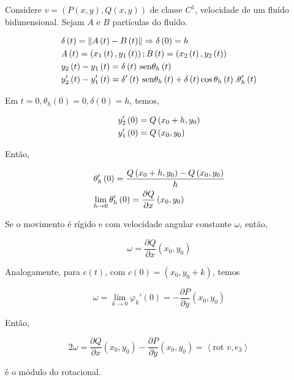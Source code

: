 \documentclass{book}
\begin{document}
\begin{ex}
Considere $v = \left( {P\left( {x,y} \right),Q\left( {x,y} \right)} \right)$ de classe $C^1$, velocidade de um flu\'ido bidimensional. Sejam $A$ e $B$ part\'iculas do flu\'ido.
\end{ex}

\begin{sol}

\[
\begin{gathered}
  \delta \left( t \right) = \left\| {A\left( t \right) - B\left( t \right)} \right\| \Rightarrow \delta \left( 0 \right) = h \hfill \\
  A\left( t \right) = \left( {x_1 \left( t \right),y_1 \left( t \right)} \right);B\left( t \right) = \left( {x_2 \left( t \right),y_2 \left( t \right)} \right) \hfill \\
  y_2 \left( t \right) - y_1 \left( t \right) = \delta \left( t \right)\sin \theta _h \left( t \right) \hfill \\
  y_2 '\left( t \right) - y_1 '\left( t \right) = \delta '\left( t \right)\sin \theta _h \left( t \right) + \delta \left( t \right)\cos \theta _h \left( t \right).\theta _h '\left( t \right) \hfill \\
\end{gathered}
\]

Em $t = 0,\theta _h \left( 0 \right) = 0,\delta \left( 0 \right) = h$, temos,

\[
\begin{gathered}
  y_2 '\left( 0 \right) = Q\left( {x_0  + h,y_0 } \right) \hfill \\
  y_1 '\left( 0 \right) = Q\left( {x_0 ,y_0 } \right) \hfill \\
\end{gathered}
\]

Ent\~ao,

\[
\begin{gathered}
  \theta _h '\left( 0 \right) = \frac{{Q\left( {x_0  + h,y_0 } \right) - Q\left( {x_0 ,y_0 } \right)}}
{h} \hfill \\
  \mathop {\lim }\limits_{h \to 0} \theta _h '\left( 0 \right) = \frac{{\partial Q}}
{{\partial x}}\left( {x_0 ,y_0 } \right) \hfill \\
\end{gathered}
\]

Se o movimento \'e r\'igido e com velocidade angular constante $\omega$, ent\~ao,

\[
\omega  = \frac{{\partial Q}}{{\partial x}}\left( {x_0 ,y_0 } \right)
\]

Analogamente, para $c(t)$, com $c\left( 0 \right) = \left( {x_0 ,y_0  + k} \right)$, temos

\[
\omega  = \mathop {\lim }\limits_{k \to 0} \varphi _k '\left( 0 \right) =  - \frac{{\partial P}}
{{\partial y}}\left( {x_0 ,y_0 } \right)
\]

Ent\~ao,

\[
2\omega  = \frac{{\partial Q}}
{{\partial x}}\left( {x_0 ,y_0 } \right) - \frac{{\partial P}}
{{\partial y}}\left( {x_0 ,y_0 } \right) = \left\langle {{\text{rot }}v,e_3 } \right\rangle
\]

\'e o m\'odulo do rotacional.
\end{sol}
\end{document}
